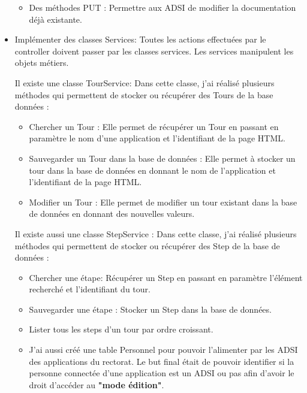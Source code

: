 \documentclass[12pt]{article}
\begin{document}
\begin{itemize}
\begin{itemize}
\item Des méthodes PUT : Permettre aux ADSI de modifier la documentation déjà existante. 

\end{itemize}
\item Implémenter des classes Services: Toutes les actions effectuées par le controller doivent passer par les classes services. Les services manipulent les objets métiers.

Il existe une classe TourService: Dans cette classe, j'ai réalisé plusieurs méthodes qui permettent de stocker ou récupérer des Tours de la base données : 
\begin{itemize}
\item Chercher un Tour : Elle permet de récupérer un Tour en passant en paramètre le nom d'une application et l'identifiant de la page HTML. 

\item Sauvegarder un Tour dans la base de données : Elle permet à stocker un tour dans la base de données en donnant le nom de l'application et l'identifiant de la page HTML. 

\item Modifier un Tour : Elle permet de modifier un tour existant dans la base de données en donnant des nouvelles valeurs. 
\end{itemize}

Il existe aussi une classe StepService : Dans cette classe, j'ai réalisé plusieurs méthodes qui permettent de stocker ou récupérer des Step de la base de données : 
\begin{itemize}

\item Chercher une étape: Récupérer un Step en passant en paramètre l'élément recherché et l'identifiant du tour.

\item Sauvegarder une étape : Stocker un Step dans la base de données.

\item Lister tous les steps d'un tour par ordre croissant.  \\


\item J'ai aussi créé une table Personnel pour pouvoir l'alimenter par les ADSI des applications du rectorat. Le but final était de pouvoir identifier si la personne connectée d'une application est un ADSI ou pas afin d'avoir le droit d'accéder au \textbf{"mode édition"}. 

\end{itemize}
\end{itemize}
\end{document}
